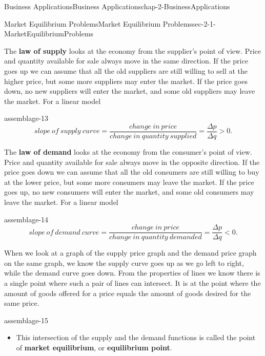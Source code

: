 \documentclass[oneside,10pt,]{book}
\newcommand{\terminology}[1]{\textbf{#1}}
\numberwithin{equation}{section}
\newcommand{\lt}{<}
\newcommand{\gt}{>}
\begin{document}
\begin{chapterptx}{Business Applications}{}{Business Applications}{}{}{chap-2-BusinessApplications}
\begin{sectionptx}{Market Equilibrium Problems}{}{Market Equilibrium Problems}{}{}{sec-2-1-MarketEquilibriumProblems}
\par
\hypertarget{p-553}{}%
The \terminology{law of supply} looks at the economy from the supplier’s point of view.  Price and quantity available for sale always move in the same direction.  If the price goes up we can assume that all the old suppliers are still willing to sell at the higher price, but some more suppliers may enter the market.  If the price goes down, no new suppliers will enter the market, and some old suppliers may leave the market.  For a linear model%
\begin{assemblage}{}{assemblage-13}%
\hypertarget{p-554}{}%
%
\begin{equation*}
slope\  of\ supply\ curve=\frac{change\ in\ price}{change\ in\ quantity\ supplied}=
\frac{\Delta p}{\Delta q} \gt 0.
\end{equation*}
%
\end{assemblage}
\hypertarget{p-555}{}%
The \terminology{law of demand} looks at the economy from the consumer’s point of view.  Price and quantity available for sale always move in the opposite direction.  If the price goes down we can assume that all the old consumers are still willing to buy at the lower price, but some more consumers may leave the market.  If the price goes up, no new consumers will enter the market, and some old consumers may leave the market.  For a linear model%
\begin{assemblage}{}{assemblage-14}%
\hypertarget{p-556}{}%
%
\begin{equation*}
slope\  of\ demand\ curve=\frac{change\ in\ price}{change\ in\ quantity\ demanded}=
\frac{\Delta p}{\Delta q} \lt 0. 
\end{equation*}
%
\end{assemblage}
\hypertarget{p-557}{}%
When we look at a graph of the supply price graph and the demand price graph on the same graph, we know the supply curve goes up as we go left to right, while the demand curve goes down.  From the properties of lines we know there is a single point where such a pair of lines can intersect.  It is at the point where the amount of goods offered for a price equals the amount of goods desired for the same price.%
\begin{assemblage}{}{assemblage-15}%
\hypertarget{p-558}{}%
\leavevmode%
\begin{itemize}[label=\textbullet]
\item{}\hypertarget{p-559}{}%
This intersection of the supply and the demand functions is called the point of \terminology{market equilibrium}, or \terminology{equilibrium point}.%

\end{itemize}
\end{assemblage}
\end{sectionptx}
\end{chapterptx}
\end{document}
